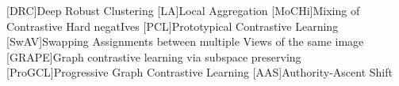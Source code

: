 \begin{acronym}

    [DRC]{Deep Robust Clustering}
    [LA]{Local Aggregation}
    [MoCHi]{Mixing of Contrastive Hard negatIves}
    [PCL]{Prototypical Contrastive Learning}
    [SwAV]{Swapping Assignments between multiple Views of the same image}
    [GRAPE]{Graph contrastive learning via subspace preserving}
    [ProGCL]{Progressive Graph Contrastive Learning}
    [AAS]{Authority-Ascent Shift}

\end{acronym}